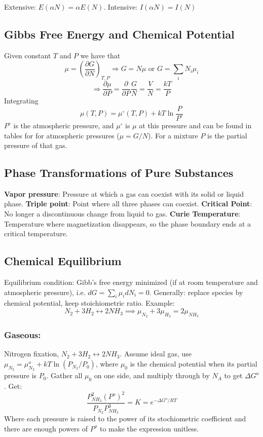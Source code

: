 \documentclass[a4paper,norsk, 10pt]{article}
\newcommand{\pd}[3]{\left(\frac{\partial #1}{\partial #2}\right)_{#3}}
\begin{document}
Extensive: $E(\alpha N) = \alpha E(N)$. Intensive: $I(\alpha N) = I(N)$
\subsection{Gibbs Free Energy and Chemical Potential}
Given constant $T$ and $P$ we have that
\begin{equation}
\mu = \pd{G}{N}{T,P} \Rightarrow G = N\mu \text{ or } G = \sum_i N_i \mu_i
\end{equation}
\begin{equation}
\Rightarrow\frac{\partial \mu}{\partial P} = \frac{\partial}{\partial P}\frac{G}{N} = \frac{V}{N} = \frac{kT}{P}
\end{equation}
Integrating
\begin{equation}
\mu(T,P) = \mu^\circ(T,P) + kT \ln\frac{P}{P^\circ}
\end{equation}
$P^\circ$ is the atmospheric pressure, and $\mu^\circ$ is $\mu$ at this pressure and can be found in tables for for atmospheric pressures ($\mu = G/N$).  For a mixture $P$ is the partial pressure of that gas.

\subsection{Phase Transformations of Pure Substances}
\textbf{Vapor pressure}: Pressure at which a gas can coexist with its solid or liquid phase. \textbf{Triple point}: Point where all three phases can coexist. \textbf{Critical Point}: No longer a discontinuous change from liquid to gas. \textbf{Curie Temperature}: Temperature where magnetization disappears, so the phase boundary ends at a critical temperature.

\subsection{Chemical Equilibrium}
Equilibrium condition: Gibb's free energy minimized (if at room temperature and atmospheric pressure), i.e. $dG=\sum_i \mu_idN_i=0$. Generally: replace species by chemical potential, keep stoichiometric ratio. Example:
\begin{equation}
N_2+3H_2 \leftrightarrow 2NH_3 \implies \mu_{N_2}+3\mu_{H_2}=2\mu_{NH_3}
\end{equation}
\subsubsection{Gaseous:}
Nitrogen fixation, $N_2+3H_2 \leftrightarrow 2NH_3$. Assume ideal gas, use $\mu_{N_2}=\mu^o_{N_2}+kT\ln\left(P_{N_2}/P_0\right)$, where $\mu_0$ is the chemical potential when its partial pressure is $P_0$. Gather all $\mu_0$ on one side, and multiply through by $N_A$ to get $\Delta G^o$. Get:
\begin{equation}
\frac{P^2_{NH_3}(P^o)^2}{P_{N_2}P^3_{NH_3}}=K=e^{-\Delta G^o/RT}
\end{equation}
Where each pressure is raised to the power of its stochiometric coefficient and there are enough powers of $P^o$ to make the expression unitless.
\end{document}

